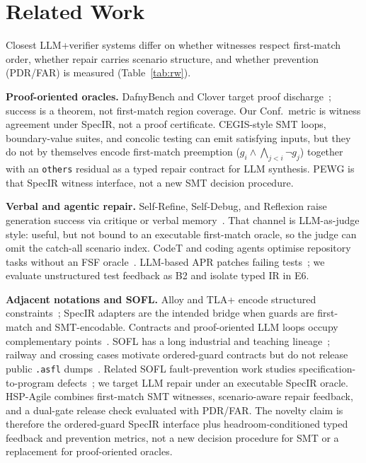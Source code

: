 \documentclass[10pt,conference]{IEEEtran}
\newcommand{\runin}[1]{\medskip\noindent\textbf{#1}\enspace}
\begin{document}
\section{Related Work}
Closest LLM+verifier systems differ on whether witnesses respect first-match
order, whether repair carries scenario structure, and whether prevention
(PDR/FAR) is measured (Table~\ref{tab:rw}).

\runin{Proof-oriented oracles.}
DafnyBench and Clover target proof
discharge~\cite{loughridge2024dafnybench,sun2024clover}; success is a theorem,
not first-match region coverage.
Our Conf.\ metric is witness agreement under SpecIR, not a proof certificate.
CEGIS-style SMT loops, boundary-value suites, and concolic testing can emit
satisfying inputs, but they do not by themselves encode first-match
preemption ($g_i\land\bigwedge_{j<i}\neg g_j$) together with an \texttt{others}
residual as a typed repair contract for LLM synthesis.
PEWG is that SpecIR witness interface, not a new SMT decision procedure.

\runin{Verbal and agentic repair.}
Self-Refine, Self-Debug, and Reflexion raise generation success via critique or
verbal memory~\cite{madaan2023selfrefine,chen2024selfdebug,shinn2023reflexion}.
That channel is LLM-as-judge style: useful, but not bound to an executable
first-match oracle, so the judge can omit the catch-all scenario index.
CodeT and coding agents optimise repository tasks without an FSF
oracle~\cite{chen2023codet,wang2024opendevin,yang2024sweagent,xia2025agentless,jimenez2024swebench}.
LLM-based APR patches failing tests~\cite{xia2024chatrepair,jiang2023impact,legoues2019apr,bouzenia2024repairagent,fan2023llmrepair};
we evaluate unstructured test feedback as B2 and isolate typed IR in E6.

\runin{Adjacent notations and SOFL.}
Alloy and TLA+ encode structured
constraints~\cite{jackson2002alloy,lamport2002tla}; SpecIR adapters are the
intended bridge when guards are first-match and SMT-encodable.
Contracts and proof-oriented LLM loops occupy complementary
points~\cite{meyer1997oosc,first2023baldur}.
SOFL has a long industrial and teaching
lineage~\cite{liu1998sofl,liu2004soflbook,li2022qrs_companion}; railway and
crossing cases motivate ordered-guard contracts but do not release public
\texttt{.asfl} dumps~\cite{luo2017railway,liu1998railwaycrossing}.
Related SOFL fault-prevention work studies specification-to-program
defects~\cite{li2023iet_faultprevention}; we target LLM repair under an
executable SpecIR oracle.
HSP-Agile combines first-match SMT witnesses, scenario-aware repair feedback,
and a dual-gate release check evaluated with PDR/FAR.
The novelty claim is therefore the ordered-guard SpecIR interface plus
headroom-conditioned typed feedback and prevention metrics, not a new decision
procedure for SMT or a replacement for proof-oriented oracles.
\end{document}
